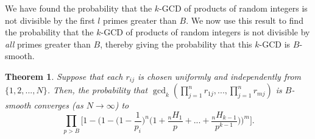 \documentclass[12pt]{amsart}
\newtheorem{theorem}{Theorem}[subsection]
\theoremstyle{definition}
\begin{document}
We have found the probability that the $k$-GCD of products of random integers is not divisible by the first \(l\) primes greater than \(B\). We now use this result to find the probability that the $k$-GCD of products of random integers is not divisible by \textit{all} primes greater than $B$, thereby giving the probability that this $k$-GCD is $B$-smooth.

\begin{theorem} Suppose that each $r_{ij}$ is chosen uniformly and independently from $\{1, 2, ..., N\}$. Then, the probability that $\gcd_k(\prod_{j=1}^n r_{1j}, ... , \prod_{j=1}^n r_{mj})$ is $B$-smooth converges (as $N \to \infty$) to
	$$\prod_{p>B} \Big[1 - \Big(1 - \Big(1-\frac{1}{p_i}\Big)^n \Big(1 + \frac{{}_nH_1}{p} + ... + \frac{{}_nH_{k-1}}{p^{k-1}}\Big)\Big)^m\Big].$$
\end{theorem}

\end{document}
